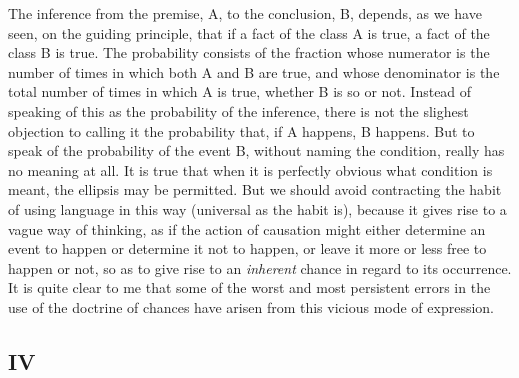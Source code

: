 The inference from the premise, A, to the conclusion, B, depends, as we have seen, on the guiding principle, that if a fact of the class A is true, a fact of the class B is true. The probability consists of the fraction whose numerator is the number of times in which both A and B are true, and whose denominator is the total number of times in which A is true, whether B is so or not. Instead of speaking of this as the probability of the inference, there is not the slighest objection to calling it the probability that, if A happens, B happens. But to speak of the probability of the event B, without naming the condition, really has no meaning at all. It is true that when it is perfectly obvious what condition is meant, the ellipsis may be permitted. But we should avoid contracting the habit of using language in this way (universal as the habit is), because it gives rise to a vague way of thinking, as if the action of causation might either determine an event to happen or determine it not to happen, or leave it more or less free to happen or not, so as to give rise to an \emph{inherent} chance in regard to its occurrence. It is quite clear to me that some of the worst and most persistent errors in the use of the doctrine of chances have arisen from this vicious mode of expression.

\subsection*{IV}

